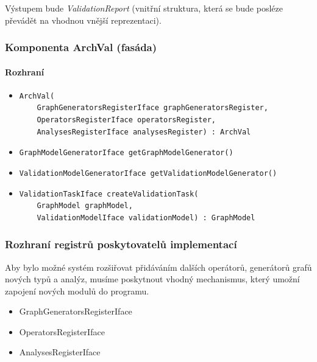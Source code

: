Výstupem bude \emph{ValidationReport} (vnitřní struktura, která se bude posléze převádět na vhodnou vnější reprezentaci).

\subsubsection{Komponenta ArchVal (fasáda)}
\paragraph{Rozhraní}
\begin{itemize}
\item \begin{verbatim}ArchVal(
    GraphGeneratorsRegisterIface graphGeneratorsRegister,
    OperatorsRegisterIface operatorsRegister,
    AnalysesRegisterIface analysesRegister) : ArchVal\end{verbatim}
\item \verb-GraphModelGeneratorIface getGraphModelGenerator()-
\item \verb-ValidationModelGeneratorIface getValidationModelGenerator()-
\item \begin{verbatim}ValidationTaskIface createValidationTask(
    GraphModel graphModel,
    ValidationModelIface validationModel) : GraphModel\end{verbatim}
\end{itemize}

\subsubsection{Rozhraní registrů poskytovatelů implementací}

Aby bylo možné systém rozšiřovat přidáváním dalších operátorů, generátorů grafů nových typů a analýz, musíme poskytnout vhodný mechanismus, který umožní zapojení nových modulů do programu.

\begin{itemize}
\item GraphGeneratorsRegisterIface
\item OperatorsRegisterIface
\item AnalysesRegisterIface
\end{itemize}

